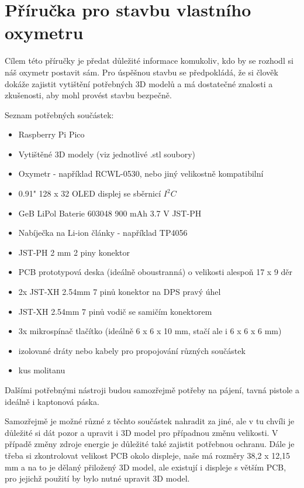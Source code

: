 \section{Příručka pro stavbu vlastního oxymetru}
\label{appn:Guide}
Cílem této příručky je předat důležité informace komukoliv, kdo by se rozhodl si náš oxymetr postavit sám. Pro úspěšnou stavbu se předpokládá, že si člověk dokáže zajistit vytištění potřebných 3D modelů a má dostatečné znalosti a zkušenosti, aby mohl provést stavbu bezpečně.
\par Seznam potřebných součástek:
\begin{itemize}
  \item Raspberry Pi Pico
  \item Vytištěné 3D modely (viz jednotlivé .stl soubory)
  \item Oxymetr - například RCWL-0530, nebo jiný velikostně kompatibilní 
  \item 0.91" 128 x 32 OLED displej se sběrnicí $I^2C$
  \item GeB LiPol Baterie 603048 900 mAh 3.7 V JST-PH
  \item Nabíječka na Li-ion články - například TP4056
  \item JST-PH 2 mm 2 piny konektor
  \item PCB prototypová deska (ideálně oboustranná) o velikosti alespoň 17 x 9 děr
  \item 2x JST-XH 2.54mm 7 pinů konektor na DPS pravý úhel
  \item JST-XH 2.54mm 7 pinů vodič se samičím konektorem
  \item 3x mikrospínač tlačítko (ideálně 6 x 6 x 10 mm, stačí ale i 6 x 6 x 6 mm)
  \item izolované dráty nebo kabely pro propojování různých součástek
  \item kus molitanu
\end{itemize}
\par Dalšími potřebnými nástroji budou samozřejmě potřeby na pájení, tavná pistole a ideálně i kaptonová páska.
\par Samozřejmě je možné různé z těchto součástek nahradit za jiné, ale v tu chvíli je důležité si dát pozor a upravit i 3D model pro případnou změnu velikosti. V případě změny zdroje energie je důležité také zajistit potřebnou ochranu. Dále je třeba si zkontrolovat velikost PCB okolo displeje, naše má rozměry 38,2 x 12,15 mm a na to je dělaný přiložený 3D model, ale existují i displeje s větším PCB, pro jejichž použití by bylo nutné upravit 3D model.
